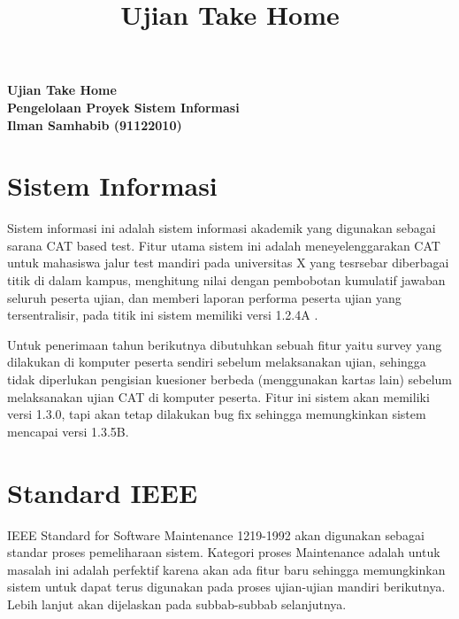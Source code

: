 \documentclass[12pt]{article}
\title{Ujian Take Home}
\begin{document}

\begin{center}
  \textbf{Ujian Take Home}\\
  \textbf{Pengelolaan Proyek Sistem Informasi}\\
   
  \textbf{Ilman Samhabib (91122010)}\\
\end{center}

\section*{Sistem Informasi}
Sistem informasi ini adalah sistem informasi akademik yang digunakan sebagai sarana CAT based test. Fitur utama sistem ini adalah meneyelenggarakan CAT untuk mahasiswa jalur test mandiri pada universitas X yang tesrsebar diberbagai titik di dalam kampus,  menghitung nilai dengan pembobotan kumulatif jawaban seluruh peserta ujian, dan memberi laporan performa peserta ujian yang tersentralisir, pada titik ini sistem memiliki versi 1.2.4A .

Untuk penerimaan tahun berikutnya  dibutuhkan sebuah fitur yaitu survey yang dilakukan di komputer peserta sendiri sebelum melaksanakan ujian, sehingga tidak diperlukan pengisian kuesioner berbeda (menggunakan kartas lain) sebelum melaksanakan ujian CAT di komputer peserta. Fitur ini sistem akan memiliki versi 1.3.0, tapi akan tetap dilakukan bug fix sehingga memungkinkan sistem mencapai versi 1.3.5B.



\section*{Standard IEEE}
IEEE Standard for Software Maintenance 1219-1992 akan digunakan sebagai standar proses pemeliharaan sistem. Kategori proses Maintenance adalah untuk masalah ini adalah perfektif karena akan ada fitur baru sehingga memungkinkan sistem untuk dapat terus digunakan pada proses ujian-ujian mandiri berikutnya. Lebih lanjut akan dijelaskan  pada subbab-subbab selanjutnya.
\end{document}
